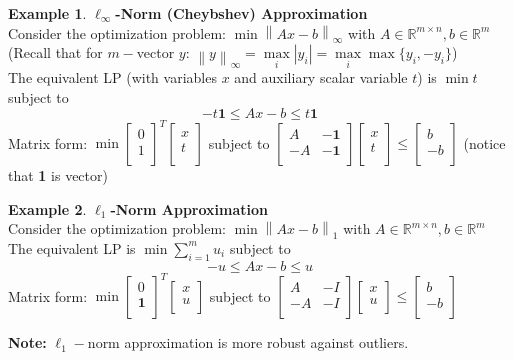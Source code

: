 \documentclass[10pt]{article}
\def\R{\mathbb{R}}
\theoremstyle{definition}
\newtheorem{example}{Example}[section]
\newcommand{\Note}[0]{\noindent\textbf{Note: }}
\newcommand{\norm}[1]{\left\lVert#1\right\rVert} %
\begin{document}
\begin{example}\textbf{$\ell_{\infty}$-Norm (Cheybshev) Approximation}\\
	Consider the optimization problem: $\min \norm{Ax-b}_{\infty}$ with $A \in \R^{m\times n}, b\in \R^m$\\
	(Recall that for $m-$vector $y$: $\norm{y}_{\infty} = \max\limits_{i}|y_i| = \max\limits_{i}\max\{y_i, -y_i\}$)\\
	The equivalent LP (with variables $x$ and auxiliary scalar variable $t$) is
	$\min t$
	subject to
	$$-t\textbf{1} \le Ax - b \le t\textbf{1}$$
	Matrix form:
	$\min \begin{bmatrix} 0\\1\\ \end{bmatrix}^T\begin{bmatrix} x\\ t\\ \end{bmatrix}$ subject to
	$\begin{bmatrix} A & -\textbf{1}\\ -A & -\textbf{1}\\ \end{bmatrix}\begin{bmatrix} x\\ t\\ \end{bmatrix} \le \begin{bmatrix} b\\ -b\\ \end{bmatrix}$ (notice that \textbf{1} is vector)
\end{example}

\begin{example}\textbf{$\ell_{1}$-Norm Approximation}\\
	Consider the optimization problem: $\min \norm{Ax-b}_{1}$ with $A \in \R^{m\times n}, b\in \R^m$\\
	The equivalent LP is
	$\min \sum\limits_{i=1}^{m}u_i$
	subject to $$-u \le Ax - b \le u$$
	Matrix form:
	$\min \begin{bmatrix} 0\\\textbf{1}\\ \end{bmatrix}^T\begin{bmatrix} x\\ u\\ \end{bmatrix}$
	subject to
	$\begin{bmatrix} A & -I\\ -A & -I\\ \end{bmatrix}\begin{bmatrix} x\\ u\\ \end{bmatrix} \le \begin{bmatrix} b\\ -b\\ \end{bmatrix}$
\end{example}
\Note $\ell_{1}-$norm approximation is more robust against outliers.
\end{document}
